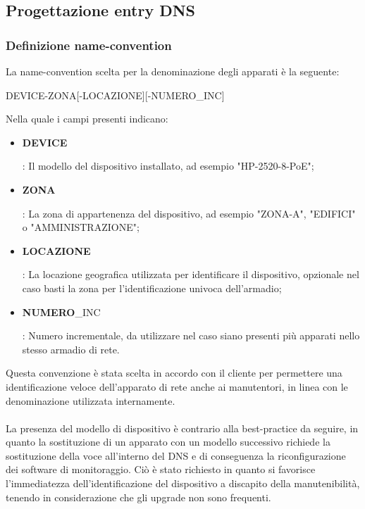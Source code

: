\documentclass[Realizzazione.tex]{subfiles}
\begin{document}
\newpage
\subsection{Progettazione entry DNS}
\subsubsection{Definizione name-convention}
La name-convention scelta per la denominazione degli apparati è la seguente:\\
{ \centering
	\begin{ttfamily}
		\large DEVICE-ZONA[-LOCAZIONE][-NUMERO\_INC]\\
	\end{ttfamily}
}
\medskip
Nella quale i campi presenti indicano: 
\begin{itemize}
	\item  \begin{ttfamily}\textbf{DEVICE}\end{ttfamily}: Il modello del dispositivo installato, ad esempio "HP-2520-8-PoE";
	\item  \begin{ttfamily}\textbf{ZONA}\end{ttfamily}: La zona di appartenenza del dispositivo, ad esempio "ZONA-A", "EDIFICI" o "AMMINISTRAZIONE";
	\item  \begin{ttfamily}\textbf{LOCAZIONE}\end{ttfamily}: La locazione geografica utilizzata per identificare il dispositivo, opzionale nel caso basti la zona per l'identificazione univoca dell'armadio;
	\item  \begin{ttfamily}\textbf{NUMERO}\_INC\end{ttfamily}: Numero incrementale, da utilizzare nel caso siano presenti più apparati nello stesso armadio di rete.
\end{itemize}

Questa convenzione è stata scelta in accordo con il cliente per permettere una identificazione veloce dell'apparato di rete anche ai manutentori, in linea con le denominazione utilizzata internamente. \\\\
La presenza del modello di dispositivo è contrario alla best-practice da seguire, in quanto la sostituzione di un apparato con un modello successivo richiede la sostituzione della voce all'interno del DNS e di conseguenza la riconfigurazione dei software di monitoraggio. Ciò è stato richiesto in quanto si favorisce l'immediatezza dell'identificazione del dispositivo a discapito della manutenibilità, tenendo in considerazione che gli upgrade non sono frequenti. \\
\end{document}

